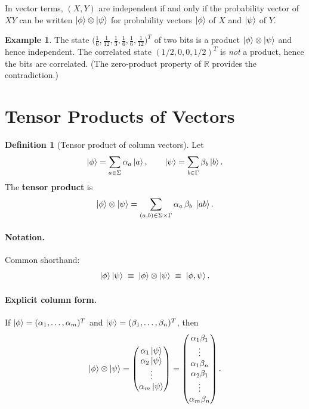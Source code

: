 \documentclass[11pt]{article}
\theoremstyle{definition}
\newtheorem{definition}{Definition}[section]
\newtheorem{example}{Example}[section]
\begin{document}
In vector terms, $(X,Y)$ are independent if and only if the probability vector of $XY$ can be written $\ket{\phi}\otimes\ket{\psi}$ for probability vectors $\ket{\phi}$ of $X$ and $\ket{\psi}$ of $Y$.

\begin{example}
The state $\bigl(\frac{1}{6},\frac{1}{12},\frac{1}{3},\frac{1}{6},\frac{1}{6},\frac{1}{12}\bigr)^T$ of two bits is a product $\ket{\phi}\otimes\ket{\psi}$ and hence independent.  The correlated state $(1/2,0,0,1/2)^T$ is \emph{not} a product, hence the bits are correlated.  (The zero-product property of $\mathbb{R}$ provides the contradiction.)
\end{example}

\section{Tensor Products of Vectors}

\begin{definition}[Tensor product of column vectors]
Let
\[
    \ket{\phi}=\sum_{a\in\Sigma}\alpha_a\ket{a},\qquad
    \ket{\psi}=\sum_{b\in\Gamma}\beta_b\ket{b}.
\]
The \textbf{tensor product} is
\[
    \ket{\phi}\otimes\ket{\psi}
    = \sum_{(a,b)\in\Sigma\times\Gamma}\alpha_a\,\beta_b\;\ket{ab}.
\]
\end{definition}

\paragraph{Notation.}  Common shorthand:
\[
    \ket{\phi}\ket{\psi} \;\equiv\; \ket{\phi}\otimes\ket{\psi}
    \;\equiv\; \ket{\phi,\psi}.
\]

\paragraph{Explicit column form.}  If $\ket{\phi}=(\alpha_1,\dots,\alpha_m)^T$ and $\ket{\psi}=(\beta_1,\dots,\beta_n)^T$, then
\[
    \ket{\phi}\otimes\ket{\psi}
    = \begin{pmatrix}\alpha_1\ket{\psi}\\\alpha_2\ket{\psi}\\\vdots\\\alpha_m\ket{\psi}\end{pmatrix}
    = \begin{pmatrix}\alpha_1\beta_1\\\vdots\\\alpha_1\beta_n\\\alpha_2\beta_1\\\vdots\\\alpha_m\beta_n\end{pmatrix}.
\]
\end{document}
